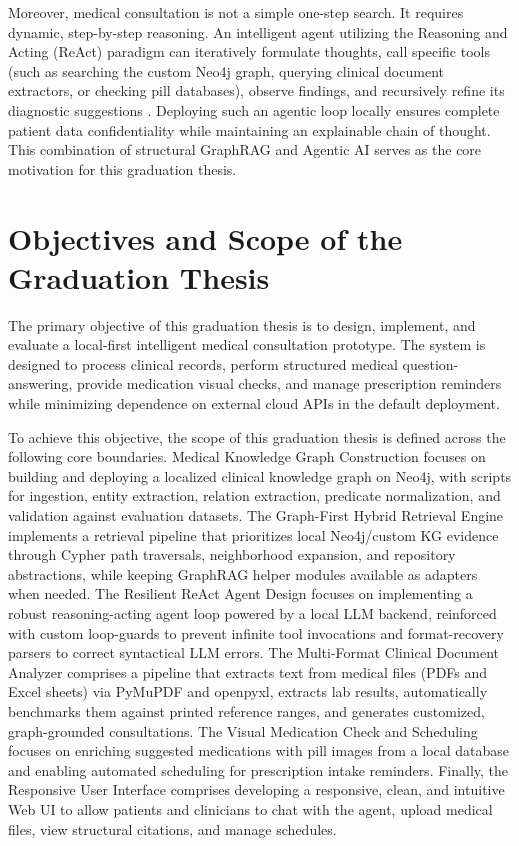 \documentclass[../main.tex]{subfiles}
\begin{document}
Moreover, medical consultation is not a simple one-step search. It requires dynamic, step-by-step reasoning. An intelligent agent utilizing the Reasoning and Acting (ReAct) paradigm can iteratively formulate thoughts, call specific tools (such as searching the custom Neo4j graph, querying clinical document extractors, or checking pill databases), observe findings, and recursively refine its diagnostic suggestions \cite{yao2022react}. Deploying such an agentic loop locally ensures complete patient data confidentiality while maintaining an explainable chain of thought. This combination of structural GraphRAG and Agentic AI serves as the core motivation for this graduation thesis.

\section{Objectives and Scope of the Graduation Thesis}
\label{section:1.2}
The primary objective of this graduation thesis is to design, implement, and evaluate a local-first intelligent medical consultation prototype. The system is designed to process clinical records, perform structured medical question-answering, provide medication visual checks, and manage prescription reminders while minimizing dependence on external cloud APIs in the default deployment.

To achieve this objective, the scope of this graduation thesis is defined across the following core boundaries. Medical Knowledge Graph Construction focuses on building and deploying a localized clinical knowledge graph on Neo4j, with scripts for ingestion, entity extraction, relation extraction, predicate normalization, and validation against evaluation datasets. The Graph-First Hybrid Retrieval Engine implements a retrieval pipeline that prioritizes local Neo4j/custom KG evidence through Cypher path traversals, neighborhood expansion, and repository abstractions, while keeping GraphRAG helper modules available as adapters when needed. The Resilient ReAct Agent Design focuses on implementing a robust reasoning-acting agent loop powered by a local LLM backend, reinforced with custom loop-guards to prevent infinite tool invocations and format-recovery parsers to correct syntactical LLM errors. The Multi-Format Clinical Document Analyzer comprises a pipeline that extracts text from medical files (PDFs and Excel sheets) via PyMuPDF and openpyxl, extracts lab results, automatically benchmarks them against printed reference ranges, and generates customized, graph-grounded consultations. The Visual Medication Check and Scheduling focuses on enriching suggested medications with pill images from a local database and enabling automated scheduling for prescription intake reminders. Finally, the Responsive User Interface comprises developing a responsive, clean, and intuitive Web UI to allow patients and clinicians to chat with the agent, upload medical files, view structural citations, and manage schedules.
\end{document}
